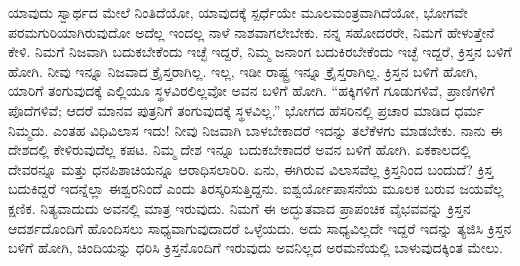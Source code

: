 ಯಾವುದು ಸ್ವಾರ್ಥದ ಮೇಲೆ ನಿಂತಿದೆಯೋ, ಯಾವುದಕ್ಕೆ ಸ್ಪರ್ಧೆಯೇ ಮೂಲಮಂತ್ರವಾಗಿದೆಯೋ, ಭೋಗವೇ ಪರಮಗುರಿಯಾಗಿರುವುದೋ ಅದೆಲ್ಲ ಇಂದಲ್ಲ ನಾಳೆ ನಾಶವಾಗಲೇಬೇಕು. ನನ್ನ ಸಹೋದರರೇ, ನಿಮಗೆ ಹೇಳುತ್ತೇನೆ ಕೇಳಿ. ನಿಮಗೆ ನಿಜವಾಗಿ ಬದುಕಬೇಕೆಂದು ಇಚ್ಛೆ ಇದ್ದರೆ, ನಿಮ್ಮ ಜನಾಂಗ ಬದುಕಿರಬೇಕೆಂದು ಇಚ್ಛೆ ಇದ್ದರೆ, ಕ್ರಿಸ್ತನ ಬಳಿಗೆ ಹೋಗಿ. ನೀವು ಇನ್ನೂ ನಿಜವಾದ ಕ್ರೈಸ್ತರಾಗಿಲ್ಲ. ಇಲ್ಲ, ಇಡೀ ರಾಷ್ಟ್ರ ಇನ್ನೂ ಕ್ರೈಸ್ತರಾಗಿಲ್ಲ. ಕ್ರಿಸ್ತನ ಬಳಿಗೆ ಹೋಗಿ, ಯಾರಿಗೆ ತಂಗುವುದಕ್ಕೆ ಎಲ್ಲಿಯೂ ಸ್ಥಳವಿರಲಿಲ್ಲವೋ ಅವನ ಬಳಿಗೆ ಹೋಗಿ. “ಹಕ್ಕಿಗಳಿಗೆ ಗೂಡುಗಳಿವೆ, ಪ್ರಾಣಿಗಳಿಗೆ ಪೊದೆಗಳಿವೆ; ಆದರೆ ಮಾನವ ಪುತ್ರನಿಗೆ ತಂಗುವುದಕ್ಕೆ ಸ್ಥಳವಿಲ್ಲ.” ಭೋಗದ ಹೆಸರಿನಲ್ಲಿ ಪ್ರಚಾರ ಮಾಡಿದ ಧರ್ಮ ನಿಮ್ಮದು. ಎಂತಹ ವಿಧಿವಿಲಾಸ ಇದು! ನೀವು ನಿಜವಾಗಿ ಬಾಳಬೇಕಾದರೆ ಇದನ್ನು ತಲೆಕೆಳಗು ಮಾಡಬೇಕು. ನಾನು ಈ ದೇಶದಲ್ಲಿ ಕೇಳಿರುವುದೆಲ್ಲ ಕಪಟ. ನಿಮ್ಮ ದೇಶ ಇನ್ನೂ ಬದುಕಬೇಕಾದರೆ ಅವನ ಬಳಿಗೆ ಹೋಗಿ. ಏಕಕಾಲದಲ್ಲಿ ದೇವರನ್ನೂ ಮತ್ತು ಧನಪಿಶಾಚಿಯನ್ನೂ ಆರಾಧಿಸಲಾರಿರಿ. ಏನು, ಈಗಿರುವ ವಿಲಾಸವೆಲ್ಲ ಕ್ರಿಸ್ತನಿಂದ ಬಂದುದೆ? ಕ್ರಿಸ್ತ ಬದುಕಿದ್ದರೆ ಇದನ್ನೆಲ್ಲಾ ಈಶ್ವರನಿಂದೆ ಎಂದು ತಿರಸ್ಕರಿಸುತ್ತಿದ್ದನು. ಐಶ್ವರ್ಯೋಪಾಸನೆಯ ಮೂಲಕ ಬರುವ ಜಯವೆಲ್ಲ ಕ್ಷಣಿಕ. ನಿತ್ಯವಾದುದು ಅವನಲ್ಲಿ ಮಾತ್ರ ಇರುವುದು. ನಿಮಗೆ ಈ ಅದ್ಭುತವಾದ ಪ್ರಾಪಂಚಿಕ ವೈಭವವನ್ನು ಕ್ರಿಸ್ತನ ಆದರ್ಶದೊಂದಿಗೆ ಹೊಂದಿಸಲು ಸಾಧ್ಯವಾಗುವುದಾದರೆ ಒಳ್ಳೆಯದು. ಅದು ಸಾಧ್ಯವಿಲ್ಲದೇ ಇದ್ದರೆ ಇದನ್ನು ತ್ಯಜಿಸಿ ಕ್ರಿಸ್ತನ ಬಳಿಗೆ ಹೋಗಿ, ಚಿಂದಿಯನ್ನು ಧರಿಸಿ ಕ್ರಿಸ್ತನೊಂದಿಗೆ ಇರುವುದು ಅವನಿಲ್ಲದ ಅರಮನೆಯಲ್ಲಿ ಬಾಳುವುದಕ್ಕಿಂತ ಮೇಲು.

